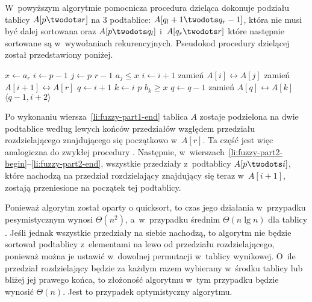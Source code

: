 W~powyższym algorytmie pomocnicza procedura dzieląca dokonuje podziału tablicy $A[p\twodots r]$ na 3 podtablice: $A[q_l+1\twodots q_r-1]$, która nie musi być dalej sortowana oraz $A[p\twodots q_l]$ i~$A[q_r\twodots r]$ które następnie sortowane są w~wywołaniach rekurencyjnych. Pseudokod procedury dzielącej został przedstawiony poniżej.

\begin{codebox}
\li	$x\gets a_r$
\li $i\gets p-1$
\li	\For $j\gets p$ \To $r-1$
\li		\Do
			\If $a_j\le x$
\li				\Then
					$i\gets i+1$
\li					zamień $A[i]\leftrightarrow A[j]$
				\End
		\End
\li	zamień $A[i+1]\leftrightarrow A[r]$ \label{li:fuzzy-part1-end}
\li	$q\gets i+1$ \label{li:fuzzy-part2-begin}
\li	\For $k\gets i$ \Downto $p$
\li		\Do
			\If $b_k\ge x$
\li				\Then
					$q\gets q-1$
\li					zamień $A[q]\leftrightarrow A[k]$
				\End
		\End \label{li:fuzzy-part2-end}
\li	\Return $\langle q-1,i+2\rangle$
\end{codebox}

Po wykonaniu wiersza~\ref{li:fuzzy-part1-end} tablica $A$ zostaje podzielona na dwie podtablice według lewych końców przedziałów względem przedziału rozdzielającego znajdującego się początkowo w~$A[r]$. Ta część jest więc analogiczna do zwykłej procedury . Następnie, w~wierszach~\ref{li:fuzzy-part2-begin}--\ref{li:fuzzy-part2-end}, wszystkie przedziały z~podtablicy $A[p\twodots i]$, które nachodzą na przedział rozdzielający znajdujący się teraz w~$A[i+1]$, zostają przeniesione na początek tej podtablicy.

\subproblem %
Ponieważ algorytm został oparty o quicksort, to czas jego działania w~przypadku pesymistycznym wynosi $\Theta(n^2)$, a~w~przypadku średnim $\Theta(n\lg n)$ dla tablicy . Jeśli jednak wszystkie przedziały na siebie nachodzą, to algorytm nie będzie sortował podtablicy z~elementami na lewo od przedziału rozdzielającego, ponieważ można je ustawić w~dowolnej permutacji w~tablicy wynikowej. O~ile przedział rozdzielający będzie za każdym razem wybierany w~środku tablicy lub bliżej jej prawego końca, to złożoność algorytmu w~tym przypadku będzie wynosić $\Theta(n)$. Jest to przypadek optymistyczny algorytmu.

\endinput

